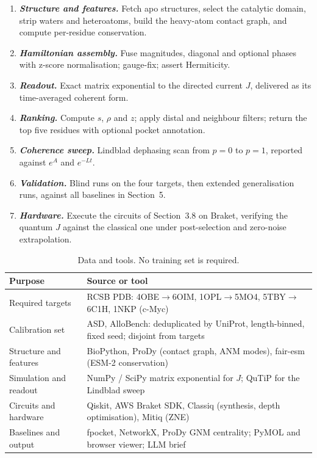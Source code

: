 \documentclass[10pt,a4paper]{article}
\newcommand{\lead}[1]{\textbf{\textit{#1}}}
\begin{document}
\begin{enumerate}
\item \lead{Structure and features.} Fetch apo structures, select the catalytic domain, strip waters
      and heteroatoms, build the heavy-atom contact graph, and compute per-residue conservation.
\item \lead{Hamiltonian assembly.} Fuse magnitudes, diagonal and optional phases with z-score
      normalisation; gauge-fix; assert Hermiticity.
\item \lead{Readout.} Exact matrix exponential to the directed current $J$, delivered as its
      time-averaged coherent form.
\item \lead{Ranking.} Compute $s$, $\rho$ and $z$; apply distal and neighbour filters; return the top
      five residues with optional pocket annotation.
\item \lead{Coherence sweep.} Lindblad dephasing scan from $p = 0$ to $p = 1$, reported against
      $e^{A}$ and $e^{-Lt}$.
\item \lead{Validation.} Blind runs on the four targets, then extended generalisation runs, against
      all baselines in Section~5.
\item \lead{Hardware.} Execute the circuits of Section~3.8 on Braket, verifying the quantum $J$
      against the classical one under post-selection and zero-noise extrapolation.
\end{enumerate}

\begin{table}[t]
\caption{Data and tools. No training set is required.}
\small
\begin{tabularx}{\textwidth}{@{}lX@{}}
\toprule
\textbf{Purpose} & \textbf{Source or tool}\\
\midrule
Required targets & RCSB PDB: 4OBE$\to$6OIM, 1OPL$\to$5MO4, 5TBY$\to$6C1H, 1NKP (c-Myc)\\
Calibration set & ASD, AlloBench: deduplicated by UniProt, length-binned, fixed seed; disjoint from targets\\
Structure and features & BioPython, ProDy (contact graph, ANM modes), fair-esm (ESM-2 conservation)\\
Simulation and readout & NumPy / SciPy matrix exponential for $J$; QuTiP for the Lindblad sweep\\
Circuits and hardware & Qiskit, AWS Braket SDK, Classiq (synthesis, depth optimisation), Mitiq (ZNE)\\
Baselines and output & fpocket, NetworkX, ProDy GNM centrality; PyMOL and browser viewer; LLM brief\\
\bottomrule
\end{tabularx}
\end{table}
\end{document}
